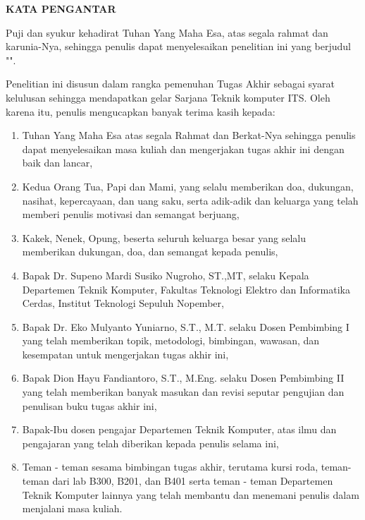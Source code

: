 \begin{center}
  \Large
  \textbf{KATA PENGANTAR}
\end{center}


\vspace{2ex}


Puji dan syukur kehadirat Tuhan Yang Maha Esa, atas segala rahmat dan karunia-Nya,
sehingga penulis dapat menyelesaikan penelitian ini yang berjudul
"\tatitle".

Penelitian ini disusun dalam rangka pemenuhan Tugas Akhir sebagai syarat kelulusan sehingga mendapatkan gelar Sarjana Teknik komputer ITS. Oleh karena itu, penulis mengucapkan banyak terima kasih kepada:

\begin{enumerate}[nolistsep]
  \item Tuhan Yang Maha Esa atas segala Rahmat dan Berkat-Nya sehingga penulis dapat menyelesaikan masa kuliah dan mengerjakan tugas akhir ini dengan baik dan lancar,

  \item Kedua Orang Tua, Papi dan Mami, yang selalu memberikan doa, dukungan, nasihat, kepercayaan, dan uang saku, serta adik-adik dan keluarga yang telah memberi penulis motivasi dan semangat berjuang,
  
  \item Kakek, Nenek, Opung, beserta seluruh keluarga besar yang selalu memberikan dukungan, doa, dan semangat kepada penulis,

  \item Bapak Dr. Supeno Mardi Susiko Nugroho, ST.,MT, selaku Kepala Departemen Teknik Komputer, Fakultas Teknologi Elektro dan Informatika Cerdas, Institut Teknologi Sepuluh Nopember,

  \item Bapak Dr. Eko Mulyanto Yuniarno, S.T., M.T. selaku Dosen Pembimbing I yang telah memberikan topik, metodologi, bimbingan, wawasan, dan kesempatan untuk mengerjakan tugas akhir ini,

  \item Bapak Dion Hayu Fandiantoro, S.T., M.Eng. selaku Dosen Pembimbing II yang telah memberikan banyak masukan dan revisi seputar pengujian dan penulisan buku tugas akhir ini,

  \item Bapak-Ibu dosen pengajar Departemen Teknik Komputer, atas ilmu dan pengajaran yang telah diberikan kepada penulis selama ini,
  
  \item Teman - teman sesama bimbingan tugas akhir, terutama kursi roda, teman-teman dari lab B300, B201, dan B401 serta teman - teman Departemen Teknik Komputer lainnya yang telah membantu dan menemani penulis dalam menjalani masa kuliah.

\end{enumerate}

